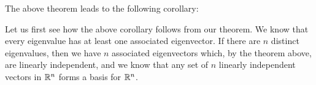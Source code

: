 \smallskip


\smallskip

The above theorem leads to the following corollary:

\smallskip


\smallskip


Let us first see how the above corollary follows from our theorem. We know that every eigenvalue has at least one associated eigenvector. If there are $n$ distinct eigenvalues, then we have $n$ associated eigenvectors which, by the theorem above, are linearly independent, and we know that any set of $n$ linearly independent vectors in $\mathbb{R}^n$ forms a basis for $\mathbb{R}^n$.


